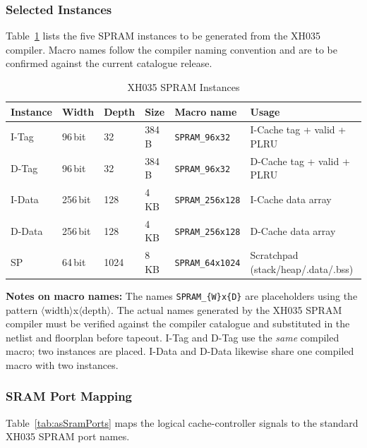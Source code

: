\subsubsection{Selected Instances}

Table~\ref{tab:asSramInstances} lists the five SPRAM instances to be
generated from the XH035 compiler.
Macro names follow the compiler naming convention and are to be confirmed
against the current catalogue release.

\begin{table}[H]
\caption{XH035 SPRAM Instances}
\label{tab:asSramInstances}
\centering
\begin{tabularx}{\textwidth}{|l |l |l |l |l |X|}
  \hline
  Instance & Width & Depth & Size & Macro name & Usage \\
  \hline
  \hline
  I-Tag  & 96\,bit  & 32   & 384\,B & \texttt{SPRAM\_96x32}   & I-Cache tag + valid + PLRU \\
  \hline
  D-Tag  & 96\,bit  & 32   & 384\,B & \texttt{SPRAM\_96x32}   & D-Cache tag + valid + PLRU \\
  \hline
  I-Data & 256\,bit & 128  & 4\,KB  & \texttt{SPRAM\_256x128} & I-Cache data array \\
  \hline
  D-Data & 256\,bit & 128  & 4\,KB  & \texttt{SPRAM\_256x128} & D-Cache data array \\
  \hline
  SP     & 64\,bit  & 1024 & 8\,KB  & \texttt{SPRAM\_64x1024} & Scratchpad (stack/heap/.data/.bss) \\
  \hline
\end{tabularx}
\end{table}

\textbf{Notes on macro names:}
The names \texttt{SPRAM\_\{W\}x\{D\}} are placeholders using the pattern
$\langle$width$\rangle$x$\langle$depth$\rangle$.
The actual names generated by the XH035 SPRAM compiler must be verified
against the compiler catalogue and substituted in the netlist and
floorplan before tapeout.
I-Tag and D-Tag use the \emph{same} compiled macro; two instances are
placed.
I-Data and D-Data likewise share one compiled macro with two instances.

\subsubsection{SRAM Port Mapping}

Table~\ref{tab:asSramPorts} maps the logical cache-controller signals
to the standard XH035 SPRAM port names.

